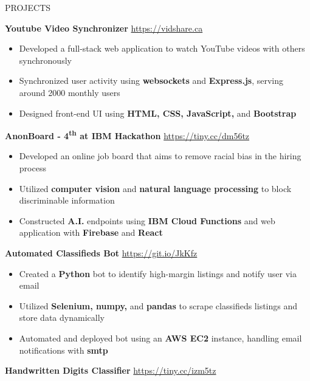 \documentclass[letterpaper,11pt,oneside]{article}
\newcommand{\createHeading}[1]{
    \vspace{1.25em}
    \hline
    \vspace{-1.5ex}
    \begin{center}
        #1
    \end{center}
    \vspace{-1.5ex}
    \hline
    \vspace{1.25em}
}
\begin{document}
\createHeading{PROJECTS}
\begin{addmargin}[.6em]{.6em}
    \textbf{Youtube Video Synchronizer} \hfill \href{https://vidshare.ca}{https://vidshare.ca}
    \begin{itemize}
        \item Developed a full-stack web application to watch YouTube videos with others synchronously
        \item Synchronized user activity using \textbf{websockets} and \textbf{Express.js}, serving around 2000 monthly users
        \item Designed front-end UI using \textbf{HTML, CSS, JavaScript,} and \textbf{Bootstrap}
    \end{itemize}
    \vspace{1.25em}
    \textbf{AnonBoard - 4\textsuperscript{th} at IBM Hackathon} \hfill \href{https://tiny.cc/dm56tz}{https://tiny.cc/dm56tz}
    \begin{itemize}
        \item Developed an online job board that aims to remove racial bias in the hiring process
        \item Utilized \textbf{computer vision} and \textbf{natural language processing} to block discriminable information
        \item Constructed \textbf{A.I.} endpoints using \textbf{IBM Cloud Functions} and web application with \textbf{Firebase} and \textbf{React}
    \end{itemize}
    \vspace{1.25em}
    \textbf{Automated Classifieds Bot} \hfill \href{https://git.io/JkKfz}{https://git.io/JkKfz}
    \begin{itemize}
        \item Created a \textbf{Python} bot to identify high-margin listings and notify user via email
        \item Utilized \textbf{Selenium, numpy,} and \textbf{pandas} to scrape classifieds listings and store data dynamically
        \item Automated and deployed bot using an \textbf{AWS EC2} instance, handling email notifications with \textbf{smtp}
    \end{itemize}
    \vspace{1.25em}
    \textbf{Handwritten Digits Classifier} \hfill \href{https://handwritten-digits-ai.netlify.app/}{https://tiny.cc/izm5tz}
    \begin{itemize}

\end{itemize}
\end{addmargin}
\end{document}
